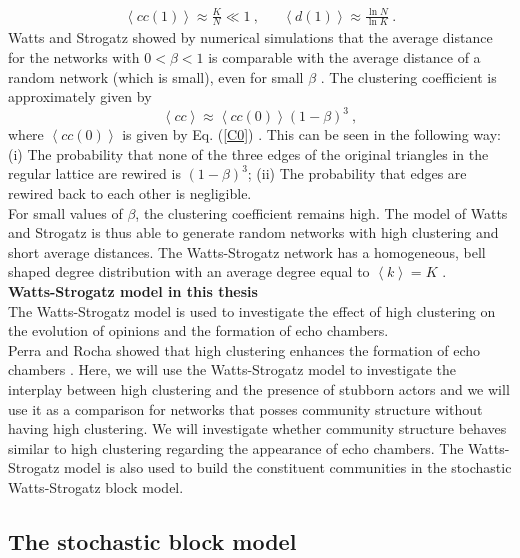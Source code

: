 \documentclass[11 pt , letterpaper , twoside , openright]{book}
\begin{document}
\begin{align}
	\left<cc(1)\right> \approx \frac{K}{N} \ll 1 \ , && \left<d(1)\right> \approx \frac{\ln{N}}{\ln{K}} \ .
\end{align}
Watts and Strogatz showed by numerical simulations that the average distance for the networks with $0 < \beta < 1$ is comparable with the average distance of a random network (which is small), even for small $\beta$ \cite{Newman2000}. The clustering coefficient is approximately given by
\begin{equation}
	\left<cc\right> \approx \left<cc(0)\right>(1-\beta)^3 \ ,
\end{equation} 
where $\left<cc(0)\right>$ is given by Eq. (\ref{C0}) \cite{Barrat1999}. This can be seen in the following way: (i) The probability that none of the three edges of the original triangles in the regular lattice are rewired is $(1-\beta)^3$; (ii) The probability that edges are rewired back to each other is negligible.\\
\newline
For small values of $\beta$, the clustering coefficient remains high. The model of Watts and Strogatz is thus able to generate random networks with high clustering and short average distances. The Watts-Strogatz network has a homogeneous, bell shaped degree distribution with an average degree equal to $\left<k\right> = K$ \cite{Barrat1999}.\\
\newline
\textbf{Watts-Strogatz model in this thesis}\\
\newline
The Watts-Strogatz model is used to investigate the effect of high clustering on the evolution of opinions and the formation of echo chambers.\\
\newline
Perra and Rocha showed that high clustering enhances the formation of echo chambers \cite{Perra2019}. Here, we will use the Watts-Strogatz model to investigate the interplay between high clustering and the presence of stubborn actors and we will use it as a comparison for networks that posses community structure without having high clustering. We will investigate whether community structure behaves similar to high clustering regarding the appearance of echo chambers. The Watts-Strogatz model is also used to build the constituent communities in the stochastic Watts-Strogatz block model.

\subsection{The stochastic block model}
\end{document}
